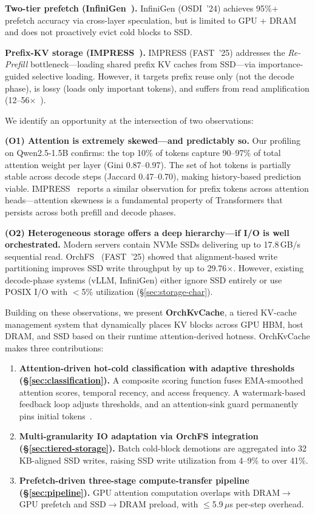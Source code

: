 \documentclass[conference]{IEEEtran}
\begin{document}
\textbf{Two-tier prefetch (InfiniGen~\cite{infinigen}).} InfiniGen (OSDI~'24) achieves 95\%+ prefetch accuracy via cross-layer speculation, but is limited to GPU + DRAM and does not proactively evict cold blocks to SSD.

\textbf{Prefix-KV storage (IMPRESS~\cite{impress}).} IMPRESS (FAST~'25) addresses the \emph{Re-Prefill} bottleneck---loading shared prefix KV caches from SSD---via importance-guided selective loading. However, it targets prefix reuse only (not the decode phase), is lossy (loads only important tokens), and suffers from read amplification (12--56$\times$~\cite{impress}).

We identify an opportunity at the intersection of two observations:

\textbf{(O1) Attention is extremely skewed---and predictably so.} Our profiling on Qwen2.5-1.5B confirms: the top 10\% of tokens capture 90--97\% of total attention weight per layer (Gini 0.87--0.97). The set of hot tokens is partially stable across decode steps (Jaccard 0.47--0.70), making history-based prediction viable. IMPRESS~\cite{impress} reports a similar observation for prefix tokens across attention heads---attention skewness is a fundamental property of Transformers that persists across both prefill and decode phases.

\textbf{(O2) Heterogeneous storage offers a deep hierarchy---if I/O is well orchestrated.} Modern servers contain NVMe SSDs delivering up to 17.8\,GB/s sequential read. OrchFS~\cite{orchfs} (FAST~'25) showed that alignment-based write partitioning improves SSD write throughput by up to 29.76$\times$. However, existing decode-phase systems (vLLM, InfiniGen) either ignore SSD entirely or use POSIX I/O with $<$5\% utilization (\S\ref{sec:storage-char}).

Building on these observations, we present \textbf{OrchKvCache}, a tiered KV-cache management system that dynamically places KV blocks across GPU HBM, host DRAM, and SSD based on their runtime attention-derived hotness. OrchKvCache makes three contributions:

\begin{enumerate}
\item \textbf{Attention-driven hot-cold classification with adaptive thresholds (\S\ref{sec:classification}).} A composite scoring function fuses EMA-smoothed attention scores, temporal recency, and access frequency. A watermark-based feedback loop adjusts thresholds, and an attention-sink guard permanently pins initial tokens~\cite{streamingllm}.

\item \textbf{Multi-granularity IO adaptation via OrchFS integration (\S\ref{sec:tiered-storage}).} Batch cold-block demotions are aggregated into 32\,KB-aligned SSD writes, raising SSD write utilization from 4--9\% to over 41\%.

\item \textbf{Prefetch-driven three-stage compute-transfer pipeline (\S\ref{sec:pipeline}).} GPU attention computation overlaps with DRAM$\to$GPU prefetch and SSD$\to$DRAM preload, with $\leq$5.9\,$\mu$s per-step overhead.
\end{enumerate}
\end{document}
